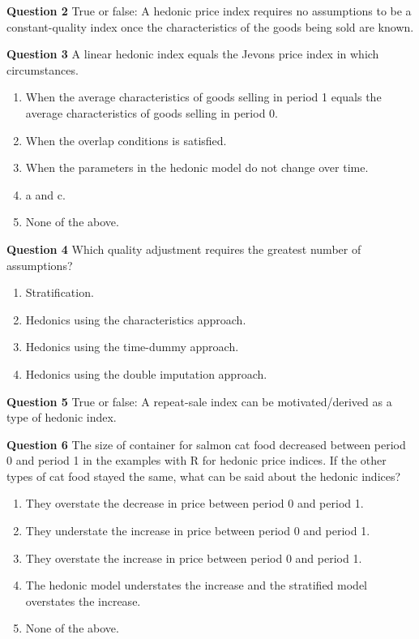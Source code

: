 \documentclass[]{article}
\begin{document}
\textbf{Question 2} True or false: A hedonic price index requires no assumptions to be a constant-quality index once the characteristics of the goods being sold are known.

\textbf{Question 3} A linear hedonic index equals the Jevons price index in which circumstances.

\begin{enumerate}
\def\labelenumi{\alph{enumi})}
\item
  When the average characteristics of goods selling in period 1 equals the average characteristics of goods selling in period 0.
\item
  When the overlap conditions is satisfied.
\item
  When the parameters in the hedonic model do not change over time.
\item
  a and c.
\item
  None of the above.
\end{enumerate}

\textbf{Question 4} Which quality adjustment requires the greatest number of assumptions?

\begin{enumerate}
\def\labelenumi{\alph{enumi})}
\item
  Stratification.
\item
  Hedonics using the characteristics approach.
\item
  Hedonics using the time-dummy approach.
\item
  Hedonics using the double imputation approach.
\end{enumerate}

\textbf{Question 5} True or false: A repeat-sale index can be motivated/derived as a type of hedonic index.

\textbf{Question 6} The size of container for salmon cat food decreased between period 0 and period 1 in the examples with R for hedonic price indices. If the other types of cat food stayed the same, what can be said about the hedonic indices?

\begin{enumerate}
\def\labelenumi{\alph{enumi})}
\item
  They overstate the decrease in price between period 0 and period 1.
\item
  They understate the increase in price between period 0 and period 1.
\item
  They overstate the increase in price between period 0 and period 1.
\item
  The hedonic model understates the increase and the stratified model overstates the increase.
\item
  None of the above.
\end{enumerate}
\end{document}
